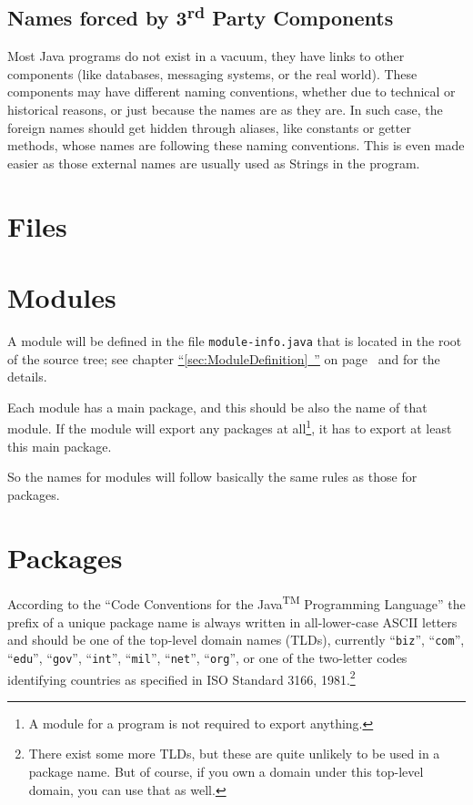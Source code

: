\documentclass[11pt,a4paper, titlepage, parskip=half, headsepline, footsepline, cleardoublepage=current, headheight=1cm]{scrbook}
\newcommand*{\tqfullvref}[1]{\hyperref[{#1}]{“\ref*{#1}~\nameref*{#1}”} on page~\pageref{#1}}
\begin{document}
\subsection{Names forced by 3\textsuperscript{rd} Party Components}
Most Java programs do not exist in a vacuum, they have links to other components (like databases, messaging systems, or the real world). These components may have different naming conventions, whether due to technical or historical reasons, or just because the names are as they are. In such case, the foreign names should get hidden through aliases, like constants or getter methods, whose names are following these naming conventions. This is even made easier as those external names are usually used as Strings in the program.

\section{Files}\label{sec:FileNames}

\section{Modules}\label{sec:Modules}
A module will be defined in the file \verb#module-info.java# that is located in the root of the source tree; see chapter \tqfullvref{sec:ModuleDefinition} and \autocite{ORACLE_DOC_LANGUAGE_SPECIFICATION:ModuleDeclarations} for the details.

Each module has a main package, and this should be also the name of that module. If the module will export any packages at all\footnote{A module for a program is not required to export anything.}, it has to export at least this main package.

So the names for modules will follow basically the same rules as those for packages.

\section{Packages}\label{sec:Packages}
According to the “Code Conventions for the Java\textsuperscript{TM} Programming Language” \autocite{SUN_CODE_CONVENTIONS} the prefix of a unique package name is always written in all-lower-case ASCII letters and should be one of the top-level domain names (TLDs), currently “\verb#biz#”, “\verb#com#”, “\verb#edu#”, “\verb#gov#”, “\verb#int#”, “\verb#mil#”, “\verb#net#”, “\verb#org#”, or one of the two-letter codes identifying countries as specified in ISO Standard 3166, 1981.\footnote{There exist some more TLDs, but these are quite unlikely to be used in a package name. But of course, if you own a domain under this top-level domain, you can use that as well.}
\end{document}

